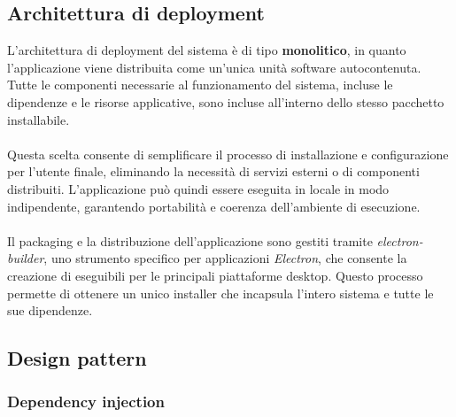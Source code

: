 \documentclass[a4paper,12pt]{article}
\begin{document}
{        \subsection{Architettura di deployment} {
            L’architettura di deployment del sistema è di tipo \textbf{monolitico}, in quanto l’applicazione viene distribuita come un’unica unità software autocontenuta. Tutte le componenti necessarie al funzionamento del sistema, incluse le dipendenze e le risorse applicative, sono incluse all’interno dello stesso pacchetto installabile.\\
            \\
            Questa scelta consente di semplificare il processo di installazione e configurazione per l’utente finale, eliminando la necessità di servizi esterni o di componenti distribuiti. L’applicazione può quindi essere eseguita in locale in modo indipendente, garantendo portabilità e coerenza dell’ambiente di esecuzione.\\
            \\
            Il packaging e la distribuzione dell’applicazione sono gestiti tramite \textit{electron-builder}, uno strumento specifico per applicazioni \textit{Electron}, che consente la creazione di eseguibili per le principali piattaforme desktop. Questo processo permette di ottenere un unico installer che incapsula l’intero sistema e tutte le sue dipendenze.
        }

        \subsection{Design pattern} {
            \subsubsection{Dependency injection} {
}}}
\end{document}
